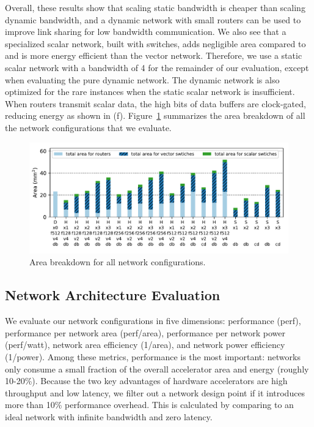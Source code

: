 Overall, these results show that scaling static bandwidth is cheaper than scaling dynamic bandwidth, and a dynamic network with small routers can be used to improve link sharing for low bandwidth communication.  
We also see that a specialized scalar network, built with switches, adds negligible area compared to and is more energy efficient than the vector network. 
Therefore, we use a static scalar network with a bandwidth of 4 for the remainder of our evaluation, except when evaluating the pure dynamic network.
The dynamic network is also optimized for the rare instances when the static scalar network is insufficient. 
When routers transmit scalar data, the high bits of data buffers are clock-gated, reducing energy as shown in (f).
Figure~\ref{fig:area} summarizes the area breakdown of all the network configurations that we evaluate.

\begin{figure}
\centering
\includegraphics[width=1\columnwidth]{network/figs/area.pdf}
  \caption{Area breakdown for all network configurations.}\label{fig:area}
\end{figure}

\subsection{Network Architecture Evaluation} \label{sec:net_dse}

We evaluate our network configurations in five dimensions: performance (perf), performance per network area (perf/area), performance per network
power (perf/watt), network area efficiency (1/area), and network power efficiency (1/power). 
Among these metrics, performance is the most important: networks only consume a small fraction of the overall accelerator area and energy (roughly 10-20\%). 
Because the two key advantages of hardware accelerators are high throughput and low latency, 
we filter out a network design point if it introduces
more than 10\% performance overhead.
This is calculated by comparing to an ideal network with infinite bandwidth and zero latency.

